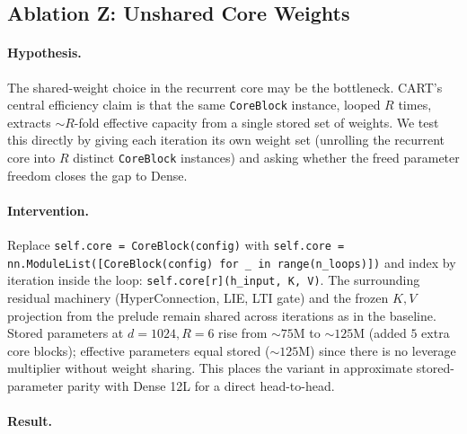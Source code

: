 \documentclass{article}
\newcommand{\cart}{\textsc{CART}}
\begin{document}
\subsection{Ablation Z: Unshared Core Weights}
\label{sec:abl_unshared}

\paragraph{Hypothesis.}
The shared-weight choice in the recurrent core may be the bottleneck. \cart{}'s central efficiency claim is that the same \texttt{CoreBlock} instance, looped $R$ times, extracts $\sim R$-fold effective capacity from a single stored set of weights. We test this directly by giving each iteration its own weight set (unrolling the recurrent core into $R$ distinct \texttt{CoreBlock} instances) and asking whether the freed parameter freedom closes the gap to Dense.

\paragraph{Intervention.}
Replace \texttt{self.core = CoreBlock(config)} with \texttt{self.core = nn.ModuleList([CoreBlock(config) for \_ in range(n\_loops)])} and index by iteration inside the loop: \texttt{self.core[r](h\_input, K, V)}. The surrounding residual machinery (HyperConnection, LIE, LTI gate) and the frozen $K, V$ projection from the prelude remain shared across iterations as in the baseline. Stored parameters at $d{=}1024, R{=}6$ rise from $\sim 75$M to $\sim 125$M (added $5$ extra core blocks); effective parameters equal stored ($\sim 125$M) since there is no leverage multiplier without weight sharing. This places the variant in approximate stored-parameter parity with Dense 12L for a direct head-to-head.

\paragraph{Result.}
\end{document}
